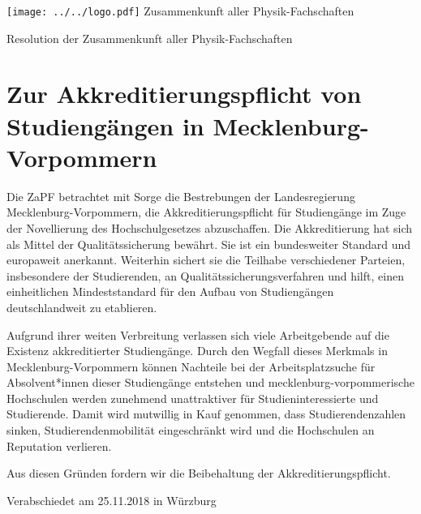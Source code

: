 \documentclass[DIV=calc]{scrartcl}
\begin{document}
    \hspace{0.87\textwidth}
    \begin{minipage}{120pt}
        \vspace{-1.8cm}
        \texttt{[image: ../../logo.pdf]}
        \centering
        \small Zusammenkunft aller Physik-Fachschaften
    \end{minipage}
    \begin{center}
        \huge{Resolution der Zusammenkunft aller Physik-Fachschaften}\vspace{.25\baselineskip}\\
        \normalsize
    \end{center}
    \vspace{1cm}

\section*{Zur Akkreditierungspflicht von Studiengängen in Mecklenburg-Vorpommern}

Die ZaPF betrachtet mit Sorge die Bestrebungen der Landesregierung \linebreak[4] Mecklenburg-Vorpommern, die Akkreditierungspflicht für Studiengänge im Zuge der Novellierung des Hochschulgesetzes abzuschaffen. Die Akkreditierung hat sich als Mittel der Qualitätssicherung bewährt. Sie ist ein bundesweiter Standard und europaweit anerkannt. Weiterhin sichert sie die Teilhabe verschiedener Parteien, insbesondere der Studierenden, an Qualitätssicherungsverfahren und hilft, einen einheitlichen Mindeststandard für den Aufbau von Studiengängen deutschlandweit zu etablieren.

Aufgrund ihrer weiten Verbreitung verlassen sich viele Arbeitgebende auf die Existenz akkreditierter Studiengänge. Durch den Wegfall dieses Merkmals in Mecklenburg-Vorpommern können Nachteile bei der Arbeitsplatzsuche für Absolvent*innen dieser Studiengänge entstehen und mecklenburg-vorpommerische Hochschulen werden zunehmend unattraktiver für Studieninteressierte und Studierende. Damit wird mutwillig in Kauf genommen, dass Studierendenzahlen sinken, Studierendenmobilität eingeschränkt wird und die Hochschulen an Reputation verlieren.

Aus diesen Gründen fordern wir die Beibehaltung der Akkreditierungspflicht.
\vfill
    \begin{flushright}
        Verabschiedet am 25.11.2018 in Würzburg
    \end{flushright}
\end{document}
